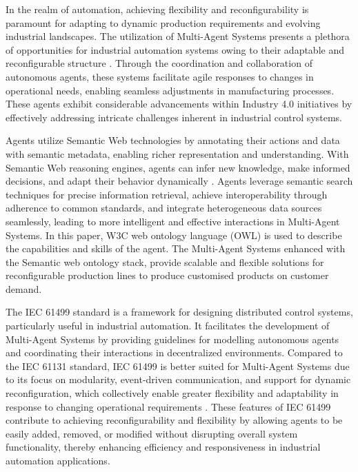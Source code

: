 \documentclass[conference]{IEEEtran}
\begin{document}
In the realm of automation, achieving flexibility and reconfigurability is paramount for adapting to dynamic production requirements and evolving industrial landscapes.
The utilization of Multi-Agent Systems presents a plethora of opportunities for industrial automation systems owing to their adaptable and reconfigurable structure \cite{NILSSON2023102450}. Through the coordination and collaboration of autonomous agents, these systems facilitate agile responses to changes in operational needs, enabling seamless adjustments in manufacturing processes. These agents exhibit considerable advancements within Industry 4.0 initiatives by effectively addressing intricate challenges inherent in industrial control systems\cite{mas_i40}.


Agents utilize Semantic Web technologies  \cite{aljosha_cap_skill_plug_play} by annotating their actions and data with semantic metadata, enabling richer representation and understanding. With Semantic Web reasoning engines, agents can infer new knowledge, make informed decisions, and adapt their behavior dynamically \cite{ochoa2023context}. Agents leverage semantic search techniques for precise information retrieval, achieve interoperability through adherence to common standards, and integrate heterogeneous data sources seamlessly, leading to more intelligent and effective interactions in Multi-Agent Systems. In this paper,  W3C web ontology language (OWL) \cite{hadzic2009ontology}  is used to describe the capabilities and skills of the agent. The Multi-Agent Systems enhanced with the Semantic web ontology stack, provide scalable and flexible solutions for reconfigurable production lines to produce customised products on customer demand.


The IEC 61499 standard \cite{iec61499part12012} is a framework for designing distributed control systems, particularly useful in industrial automation. It facilitates the development of Multi-Agent Systems by providing guidelines for modelling autonomous agents and coordinating their interactions in decentralized environments. Compared to the IEC 61131 standard, IEC 61499 is better suited for Multi-Agent Systems due to its focus on modularity, event-driven communication, and support for dynamic reconfiguration, which collectively enable greater flexibility and adaptability in response to changing operational requirements \cite{mulubika2013comparison}. These features of IEC 61499 contribute \cite{lyu2023multi} to achieving reconfigurability and flexibility by allowing agents to be easily added, removed, or modified without disrupting overall system functionality, thereby enhancing efficiency and responsiveness in industrial automation applications.
\end{document}
